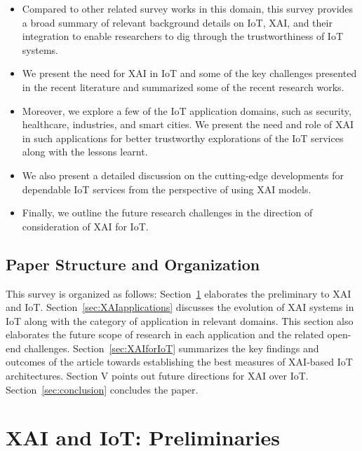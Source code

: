 \documentclass[journal]{IEEEtran}
\begin{document}
\begin{itemize}
    \item Compared to other related survey works in this domain, this survey provides a broad summary of relevant background details on IoT, XAI, and their integration to enable researchers to dig through the trustworthiness of IoT systems.
    
    \item We present the need for XAI in IoT and some of the key challenges presented in the recent literature and summarized some of the recent research works.
    
     \item Moreover, we explore a few of the IoT application domains, such as security, healthcare, industries, and smart cities. We present the need and role of XAI in such applications for better trustworthy explorations of the IoT services along with the lessons learnt.

    \item We also present a detailed discussion on the cutting-edge developments for dependable IoT services from the perspective of using XAI models. 

    \item Finally, we outline the future research challenges in the direction of consideration of XAI for IoT.
\end{itemize}

\subsection{Paper Structure and Organization}
This survey is organized as follows: Section~\ref{sec:XAIIoTprelims} elaborates the preliminary to XAI and IoT. Section~\ref{sec:XAIapplications} discusses the evolution of XAI systems in IoT along with the category of application in relevant domains. This section also elaborates the future scope of research in each application and the related open-end challenges. Section~\ref{sec:XAIforIoT} summarizes the key findings and outcomes of the article towards establishing the best measures of XAI-based IoT architectures.
Section V points out future directions for XAI over IoT. 
Section~\ref{sec:conclusion} concludes the paper.


\section{XAI and IoT: Preliminaries}
\label{sec:XAIIoTprelims}
\end{document}
